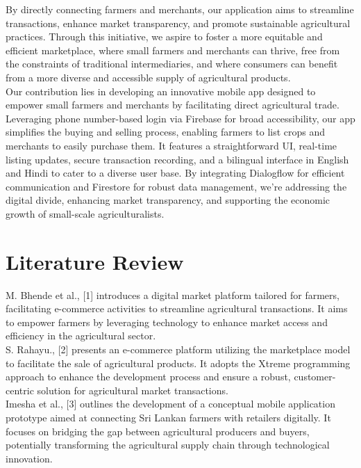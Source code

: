 \documentclass{article}
\begin{document}
By directly connecting farmers and merchants, our application aims to streamline transactions, enhance market transparency, and promote sustainable agricultural practices. Through this initiative, we aspire to foster a more equitable and efficient marketplace, where small farmers and merchants can thrive, free from the constraints of traditional intermediaries, and where consumers can benefit from a more diverse and accessible supply of agricultural products.\\

Our contribution lies in developing an innovative mobile app designed to empower small farmers and merchants by facilitating direct agricultural trade. Leveraging phone number-based login via Firebase for broad accessibility, our app simplifies the buying and selling process, enabling farmers to list crops and merchants to easily purchase them. It features a straightforward UI, real-time listing updates, secure transaction recording, and a bilingual interface in English and Hindi to cater to a diverse user base. By integrating Dialogflow for efficient communication and Firestore for robust data management, we're addressing the digital divide, enhancing market transparency, and supporting the economic growth of small-scale agriculturalists.\\

\section{Literature Review}

M. Bhende et al., [1] introduces a digital market platform tailored for farmers, facilitating e-commerce activities to streamline agricultural transactions. It aims to empower farmers by leveraging technology to enhance market access and efficiency in the agricultural sector.\\

S. Rahayu., [2] presents an e-commerce platform utilizing the marketplace model to facilitate the sale of agricultural products. It adopts the Xtreme programming approach to enhance the development process and ensure a robust, customer-centric solution for agricultural market transactions.\\

Imesha et al., [3] outlines the development of a conceptual mobile application prototype aimed at connecting Sri Lankan farmers with retailers digitally. It focuses on bridging the gap between agricultural producers and buyers, potentially transforming the agricultural supply chain through technological innovation.\\
    
\end{document}
